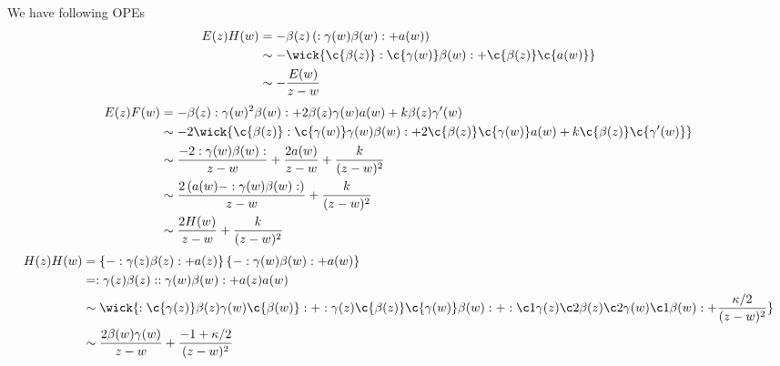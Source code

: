 \subsubsection{}
We have following OPEs
\begin{equation}
	\begin{split}
	E(z)H(w) & = - \beta(z) \left(:\gamma(w)\beta(w): + a(w) \right)\\
	& \sim - \wick{\c{\beta(z)}: \c{\gamma(w)} \beta(w): + \c{\beta(z)} \c{a(w)} } \\
	& \sim - \frac{E(w)}{z-w}
	\end{split}
\end{equation}
\begin{equation}
	\begin{split}
	E(z)F(w) & = - \beta(z) : \gamma(w)^2 \beta(w): + 2 \beta(z)\gamma(w)a(w) + k \beta(z) \gamma'(w)\\
	& \sim -2 \wick{\c{\beta(z)} :\c{\gamma(w)} \gamma(w) \beta(w): + 2 \c{\beta(z)} \c{\gamma(w)} a(w) + k \c{\beta(z)} \c{\gamma'(w)} }\\
	& \sim \frac{-2 :\gamma(w)\beta(w):}{z-w} + \frac{2a(w)}{z-w} + \frac{k}{(z-w)^2}\\
	& \sim \frac{2\left(a(w)- :\gamma(w)\beta(w): \right)}{z-w} + \frac{k}{(z-w)^2} \\
	& \sim \frac{2H(w)}{z-w} + \frac{k}{(z-w)^2}
	\end{split}
\end{equation}
\begin{equation}
	\begin{split}
	H(z)H(w)& = \left\{-: \gamma(z)\beta(z): + a(z) \right\} \left\{- : \gamma(w)\beta(w): + a(w) \right\}\\
	& = : \gamma(z)\beta(z):: \gamma(w)\beta(w): + a(z)a(w)\\
	& \sim \wick{: \c{\gamma(z)} \beta(z) \gamma(w) \c{\beta(w)}: + : \gamma(z) \c{\beta(z)} \c{\gamma(w)} \beta(w): + : \c1{\gamma(z)} \c2{\beta(z)} \c2{\gamma(w)} \c1{\beta(w)}: + \frac{\kappa/2}{(z-w)^2} }\\
	& \sim \frac{2\beta(w)\gamma(w)}{z-w} + \frac{-1+ \kappa/2}{(z-w)^2}\\
	\end{split}
\end{equation}

